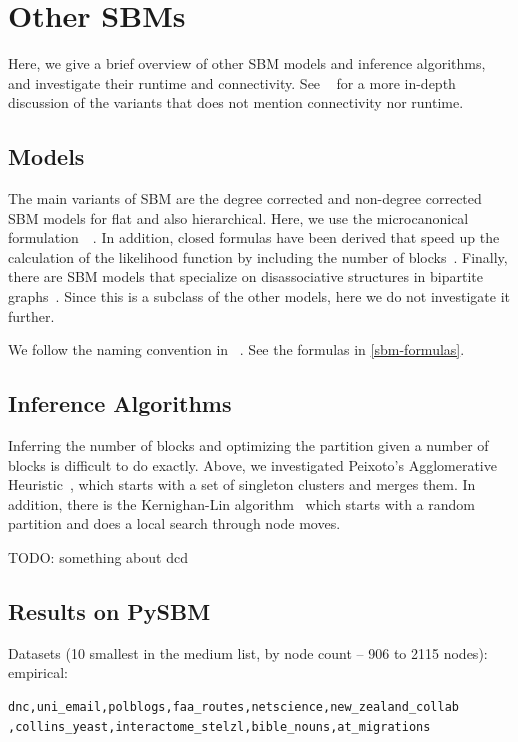 \documentclass[aps,pre,superscriptaddress]{article}
\begin{document}
\section{Other SBMs}

Here, we give a brief overview of other SBM models and inference algorithms, and investigate their runtime and connectivity.
See ~\cite{funke19-04} for a more in-depth discussion of the variants that does not mention connectivity nor runtime.

\subsection{Models}

The main variants of SBM are the degree corrected and non-degree corrected SBM models for flat and also hierarchical.
Here, we use the microcanonical formulation~\cite{peixoto17-01}~\cite{peixoto14-03}.
In addition, closed formulas have been derived that speed up the calculation of the likelihood function by including the number of blocks~\cite{come15-12}.
Finally, there are SBM models that specialize on disassociative structures in bipartite graphs~\cite{yen20-09}.
Since this is a subclass of the other models, here we do not investigate it further.

We follow the naming convention in ~\cite{funke19-04}.
See the formulas in \ref{sbm-formulas}.

\subsection{Inference Algorithms}

Inferring the number of blocks and optimizing the partition given a number of blocks is difficult to do exactly.
Above, we investigated Peixoto's Agglomerative Heuristic~\cite{peixoto14-01}, which starts with a set of singleton clusters and merges them.
In addition, there is the Kernighan-Lin algorithm~\cite{kernighan70-02} which starts with a random partition and does a local search through node moves.

TODO: something about dcd

\clearpage
\subsection{Results on PySBM}

Datasets (10 smallest in the medium list, by node count -- 906 to 2115 nodes):
empirical:
\begin{verbatim}
dnc,uni_email,polblogs,faa_routes,netscience,new_zealand_collab
,collins_yeast,interactome_stelzl,bible_nouns,at_migrations    
\end{verbatim}
\end{document}
